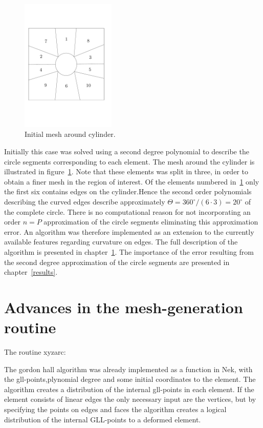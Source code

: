 %
\begin{figure}[h]
    \centering
    \includegraphics[width = 0.4\textwidth]{Figures/cyl_elem.pdf}
    \caption{Initial mesh around cylinder.}
    \label{fig:cyl_elem}
\end{figure}
%
Initially this case was solved using a second degree polynomial to describe the circle segments
corresponding to each element. The mesh around the cylinder is illustrated in figure~\ref{fig:cyl_elem}.
Note that these elements was split in three, in order to obtain 
a finer mesh in the region of interest. Of the elements numbered in~\ref{fig:cyl_elem}
only the first six contains edges on the cylinder.Hence the second order polynomials 
describing the curved edges describe approximately $\Theta = 360^{\circ}/(6\cdot 3) = 20^{\circ}$
of the complete circle. There is no computational reason 
for not incorporating an order $n=P$ approximation of the circle segments eliminating 
this approximation error. An algorithm was therefore implemented as an extension to the
currently available features regarding curvature on edges.
The full description of the algorithm is presented in 
chapter~\ref{xyzarc}. The importance of the error resulting from the second degree approximation
of the circle segments are presented in chapter~\ref{results}.
%
%
%
\section{Advances in the mesh-generation routine} \label{xyzarc}
The routine xyzarc:

The gordon hall algorithm was already implemented as a function in Nek, with the gll-points,plynomial degree and some initial 
coordinates to the element. The algorithm creates a distribution of the internal gll-points in each element. 
If the element consists of linear edges the only necessary input are the vertices, but by specifying the points on edges and faces
the algorithm creates a logical distribution of the internal GLL-points to a deformed element. 


